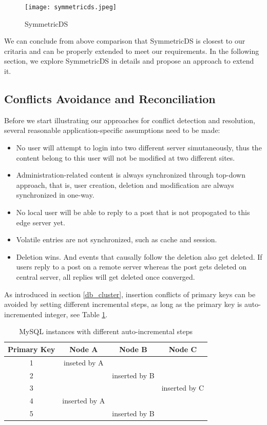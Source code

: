 \begin{figure}[htbp]
\centering
\texttt{[image: symmetricds.jpeg]}
\caption{SymmetricDS}
\label{symmetricds}
\end{figure}

We can conclude from above comparison that SymmetricDS is closest to our critaria and can be properly extended to meet our requirements. In the following section, we explore SymmetricDS in details and propose an approach to extend it.

\subsection{Conflicts Avoidance and Reconciliation} \label{multi_master}
Before we start illustrating our approaches for conflict detection and resolution, several reasonable application-specific assumptions need to be made:
\begin{itemize}
\item No user will attempt to login into two different server simutaneously, thus the content belong to this user will not be modified at two different sites.
\item Administration-related content is always synchronized through top-down approach, that is, user creation, deletion and modification are always synchronized in one-way.
\item No local user will be able to reply to a post that is not propogated to this edge server yet.
\item Volatile entries are not synchronized, such as cache and session.
\item Deletion wins. And events that causally follow the deletion also get deleted. If users reply to a post on a remote server whereas the post gets deleted on central server, all replies will get deleted once converged.
\end{itemize}

As introduced in section \ref{db_cluster}, insertion conflicts of primary keys can be avoided by setting different incremental steps, as long as the primary key is auto-incremented integer, see Table \ref{mysql_key_inc}.

\begin{table}[htbp]
\centering
\begin{tabular}{c|c|c|c}
Primary Key & Node A & Node B & Node C\\
\hline
1 & inseted by A & & \\
2 & & inserted by B & \\
3 & & & inserted by C \\
4 & inserted by A & & \\
5 & & inserted by B & \\
\end{tabular}
\caption{MySQL instances with different auto-incremental steps}
\label{mysql_key_inc}
\end{table}


